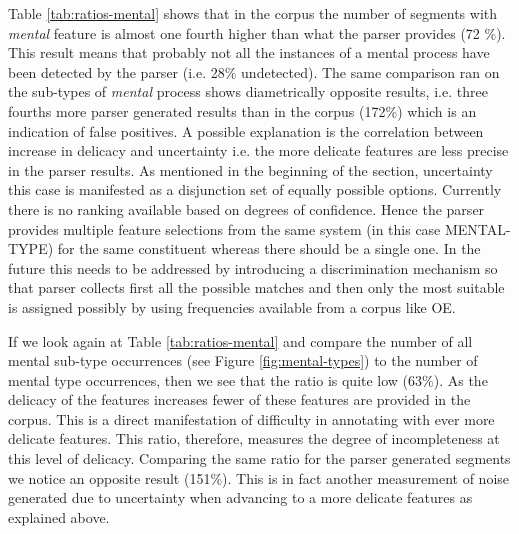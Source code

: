     Table \ref{tab:ratios-mental} shows that in the corpus the number of segments with \textit{mental} feature is almost one fourth higher than what the parser provides (72 \%). This result means that probably not all the instances of a mental process have been detected by the parser (i.e. 28\% undetected). The same comparison ran on the sub-types of \textit{mental} process shows diametrically opposite results, i.e. three fourths more parser generated results than in the corpus (172\%) which is an indication of false positives. A possible explanation is the correlation between increase in delicacy and uncertainty i.e. the more delicate features are less precise in the parser results. As mentioned in the beginning of the section, uncertainty this case is manifested as a disjunction set of equally possible options. Currently there is no ranking available based on degrees of confidence. Hence the parser provides multiple feature selections from the same system (in this case MENTAL-TYPE) for the same constituent whereas there should be a single one. In the future this needs to be addressed by introducing a discrimination mechanism so that parser collects first all the possible matches and then only the most suitable is assigned possibly by using frequencies available from a corpus like OE.
    
    If we look again at Table \ref{tab:ratios-mental} and compare the number of all mental sub-type occurrences (see Figure \ref{fig:mental-types}) to the number of mental type occurrences, then we see that the ratio is quite low (63\%). As the delicacy of the features increases fewer of these features are provided in the corpus. This is a direct manifestation of difficulty in annotating with ever more delicate features. This ratio, therefore, measures the degree of incompleteness at this level of delicacy. Comparing the same ratio for the parser generated segments we notice an opposite result (151\%). This is in fact another measurement of noise generated due to uncertainty when advancing to a more delicate features as explained above. 
    
